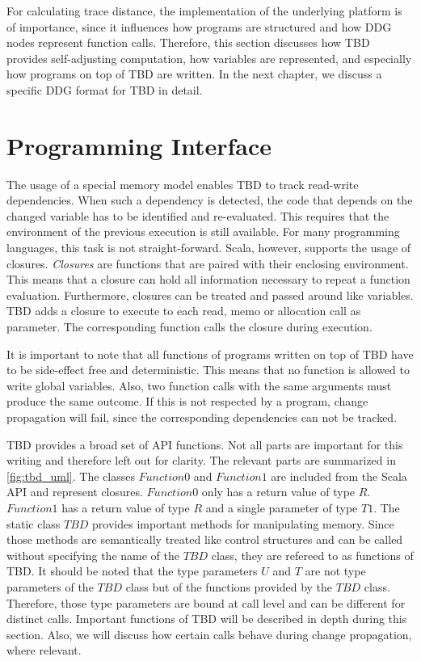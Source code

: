 For calculating trace distance, the implementation of the underlying platform is of importance, since it influences how programs are structured and how DDG nodes represent function calls. Therefore, this section discusses how TBD provides self-adjusting computation, how variables are represented, and especially how programs on top of TBD are written. In the next chapter, we discuss a specific DDG format for TBD in detail. 

\section{Programming Interface}

The usage of a special memory model enables TBD to track read-write dependencies. When such a dependency is detected, the code that depends on the changed variable has to be identified and re-evaluated. This requires that the environment of the previous execution is still available. For many programming languages, this task is not straight-forward. Scala, however, supports the usage of closures. \textit{Closures} are functions that are paired with their enclosing environment. This means that a closure can hold all information necessary to repeat a function evaluation. Furthermore, closures can be treated and passed around like variables. TBD adds a closure to execute to each read, memo or allocation call as parameter. The corresponding function calls the closure during execution. 

It is important to note that all functions of programs written on top of TBD have to be side-effect free and deterministic. This means that no function is allowed to write global variables. Also, two function calls with the same arguments must produce the same outcome. If this is not respected by a program, change propagation will fail, since the corresponding dependencies can not be tracked. 

TBD provides a broad set of API functions. Not all parts are important for this writing and therefore left out for clarity. The relevant parts are summarized in \ref{fig:tbd_uml}. The classes $Function0$ and $Function1$ are included from the Scala API and represent closures. $Function0$ only has a return value of type $R$. $Function1$ has a return value of type $R$ and a single parameter of type $T1$. The static class $TBD$ provides important methods for manipulating memory. Since those methods are semantically treated like control structures and can be called without specifying the name of the $TBD$ class, they are refereed to as functions of TBD. It should be noted that the type parameters $U$ and $T$ are not type parameters of the $TBD$ class but of the functions provided by the $TBD$ class. Therefore, those type parameters are bound at call level and can be different for distinct calls. Important functions of TBD will be described in depth during this section. Also, we will discuss how certain calls behave during change propagation, where relevant. 

